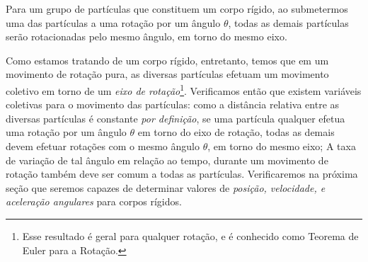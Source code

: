 \begin{marginfigure}[-4cm]
\centering
{}
\caption{Para um grupo de partículas que constituem um corpo rígido, ao submetermos uma das partículas a uma rotação por um ângulo $\theta$, todas as demais partículas serão rotacionadas pelo mesmo ângulo, em torno do mesmo eixo.}
\end{marginfigure}

Como estamos tratando de um corpo rígido, entretanto, temos que em um movimento de rotação pura, as diversas partículas efetuam um movimento coletivo em torno de um \emph{eixo de rotação}\footnote{Esse resultado é geral para qualquer rotação, e é conhecido como Teorema de Euler para a Rotação.}. Verificamos então que existem variáveis coletivas para o movimento das partículas: como a distância relativa entre as diversas partículas é constante \emph{por definição}, se uma partícula qualquer efetua uma rotação por um ângulo $\theta$ em torno do eixo de rotação, todas as demais devem efetuar rotações com o mesmo ângulo $\theta$, em torno do mesmo eixo; A taxa de variação de tal ângulo em relação ao tempo, durante um movimento de rotação também deve ser comum a todas as partículas. Verificaremos na próxima seção que seremos capazes de determinar valores de \emph{posição, velocidade, e aceleração angulares} para corpos rígidos.

